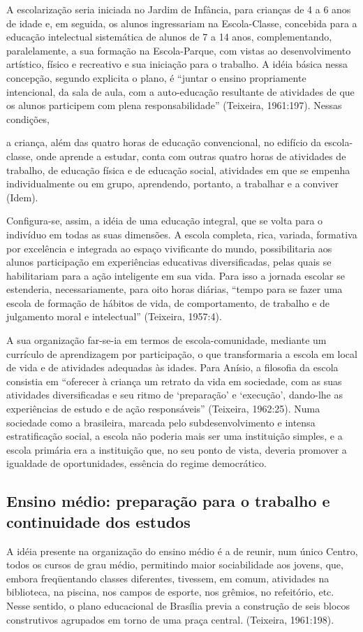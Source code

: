 A escolarização seria iniciada no Jardim de Infância, para crianças de 4 a 6 anos
de idade e, em seguida, os alunos ingressariam na Escola-Classe, concebida para a
educação intelectual sistemática de alunos de 7 a 14 anos, complementando,
paralelamente, a sua formação na Escola-Parque, com vistas ao desenvolvimento
artístico, físico e recreativo e sua iniciação para o trabalho. A idéia básica nessa
concepção, segundo explicita o plano, é “juntar o ensino propriamente intencional, da
sala de aula, com a auto-educação resultante de atividades de que os alunos participem
com plena responsabilidade” (Teixeira, 1961:197). Nessas condições,
\begin{citacao}
    a criança, além das quatro horas de educação convencional, no edifício da
    escola-classe, onde aprende a estudar, conta com outras quatro horas de
    atividades de trabalho, de educação física e de educação social, atividades
    em que se empenha individualmente ou em grupo, aprendendo, portanto, a
    trabalhar e a conviver (Idem).
\end{citacao}

Configura-se, assim, a idéia de uma educação integral, que se volta para o
indivíduo em todas as suas dimensões. A escola completa, rica, variada, formativa por
excelência e integrada ao espaço vivificante do mundo, possibilitaria aos alunos
participação em experiências educativas diversificadas, pelas quais se habilitariam para
a ação inteligente em sua vida. Para isso a jornada escolar se estenderia,
necessariamente, para oito horas diárias, “tempo para se fazer uma escola de formação
de hábitos de vida, de comportamento, de trabalho e de julgamento moral e intelectual”
(Teixeira, 1957:4).

A sua organização far-se-ia em termos de escola-comunidade, mediante um
currículo de aprendizagem por participação, o que transformaria a escola em local de
vida e de atividades adequadas às idades. Para Anísio, a filosofia da escola consistia em
“oferecer à criança um retrato da vida em sociedade, com as suas atividades
diversificadas e seu ritmo de ‘preparação’ e ‘execução’, dando-lhe as experiências de
estudo e de ação responsáveis” (Teixeira, 1962:25). Numa sociedade como a brasileira,
marcada pelo subdesenvolvimento e intensa estratificação social, a escola não poderia
mais ser uma instituição simples, e a escola primária era a instituição que, no seu ponto
de vista, deveria promover a igualdade de oportunidades, essência do regime
democrático.

\subsection{Ensino médio: preparação para o trabalho e continuidade dos estudos}
A idéia presente na organização do ensino médio é a de reunir, num único
Centro, todos os cursos de grau médio, permitindo maior sociabilidade aos jovens, que,
embora freqüentando classes diferentes, tivessem, em comum, atividades na biblioteca,
na piscina, nos campos de esporte, nos grêmios, no refeitório, etc. Nesse sentido, o
plano educacional de Brasília previa a construção de seis blocos construtivos agrupados
em torno de uma praça central. (Teixeira, 1961:198).

